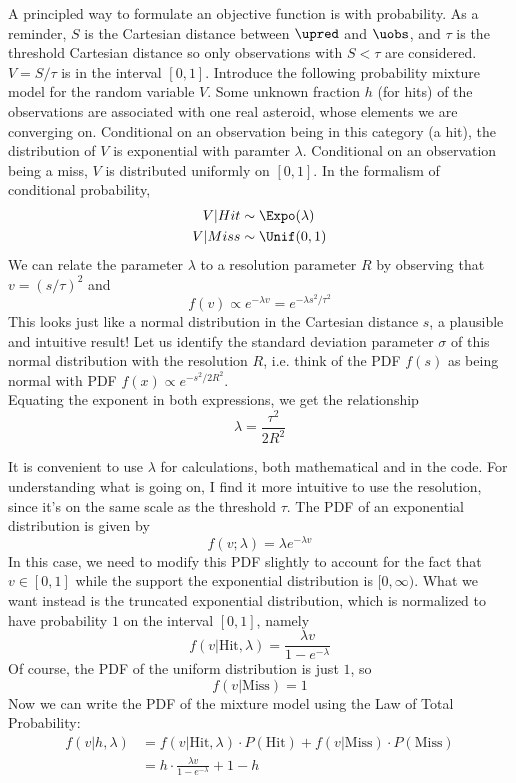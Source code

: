 A principled way to formulate an objective function is with probability.
As a reminder, $S$ is the Cartesian distance between $\upred$ and $\uobs$,
and $\tau$ is the threshold Cartesian distance so only observations with $S < \tau$ are considered.
$V = S / \tau$ is in the interval $[0, 1]$.
Introduce the following probability mixture model for the random variable $V$.
Some unknown fraction $h$ (for hits) of the observations are associated with one real asteroid, whose elements we are converging on.
Conditional on an observation being in this category (a hit), the distribution of $V$ is exponential with paramter $\lambda$.
Conditional on an observation being a miss, $V$ is distributed uniformly on $[0,1]$.
In the formalism of conditional probability,
\begin{align*}
V | Hit &\sim \Expo(\lambda) \\
V | Miss &\sim \Unif(0,1)
\end{align*}
We can relate the parameter $\lambda$ to a resolution parameter $R$ by observing that $v=(s/\tau)^2$ and
$$f(v) \propto e^{-\lambda v} = e^{-\lambda s^2 / \tau^2}$$
This looks just like a normal distribution in the Cartesian distance $s$, a plausible and intuitive result!
Let us identify the standard deviation parameter $\sigma$ of this normal distribution with the resolution $R$,
i.e. think of the PDF $f(s)$ as being normal with PDF $f(x) \propto e^{-s^2 / 2 R^2}$.\\
Equating the exponent in both expressions, we get the relationship
$$ \lambda = \frac{\tau^2}{2R^2}$$

It is convenient to use $\lambda$ for calculations, both mathematical and in the code.
For understanding what is going on, I find it more intuitive to use the resolution, since it's on the same scale as the threshold $\tau$.
The PDF of an exponential distribution is given by \cite{BH}
$$ f(v; \lambda) =\lambda e^{-\lambda v}$$
In this case, we need to modify this PDF slightly to account for the fact that $v \in [0,1]$ 
while the support the exponential distribution is $[0, \infty)$.
What we want instead is the truncated exponential distribution, which is normalized to have probability $1$ on the interval $[0,1]$, namely
$$ f(v| \mathrm{Hit}, \lambda) = \frac{\lambda v}{1 - e^{-\lambda}}$$
Of course, the PDF of the uniform distribution is just $1$, so
$$ f(v | \mathrm{Miss}) = 1$$
Now we can write the PDF of the mixture model using the Law of Total Probability:
\begin{align*}
f(v| h, \lambda) &= f(v|\mathrm{Hit}, \lambda) \cdot P(\mathrm{Hit}) + f(v|\mathrm{Miss}) \cdot P(\mathrm{Miss}) \\
&= h \cdot \frac{\lambda v}{1 - e^{-\lambda}} + 1 - h
\end{align*}

